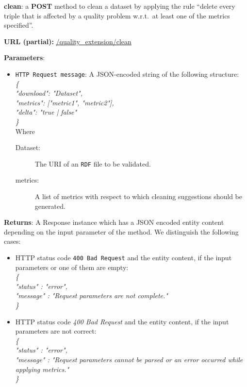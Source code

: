\begin{description}
\item{\textbf{clean}:} a \textbf{POST} method to clean a dataset by applying the rule ``delete every triple that is affected by a quality problem w.r.t.\ at least one of the metrics specified''.

\textbf{URL (partial):} \url{/quality_extension/clean} 

\textbf{Parameters}: 
\begin{itemize}
\item \texttt{HTTP Request message}: A JSON-encoded string of the following structure: \\
\textit{\{} \\
\hspace*{0.5 cm}\textit{"download": "Dataset",} \\
\hspace*{0.5 cm}\textit{"metrics": ["metric1", "metric2"],} \\
\hspace*{0.5 cm}\textit{"delta": "true | false"} \\  
\textit{\}} \\

Where 
\begin{description}
\item[Dataset:] The URI of an \texttt{RDF} file to be validated. 
\item[metrics:] A list of metrics with respect to which cleaning suggestions should be generated.
\end{description}

\end{itemize}
\textbf{Returns}: A Response instance which has a JSON encoded entity content depending on the input parameter of the method. We distinguish the following cases: 
\begin{itemize}
\item  HTTP status code \texttt{400 Bad Request} and the entity content, if the input parameters or one of them are empty:\\ \hspace*{0.2 cm}\textit{\{}\\
\hspace*{0.5 cm} \textit{"status" : "error",}\\
\hspace*{0.5 cm} \textit{"message" : "Request parameters are not complete."}\\ \hspace*{0.2 cm} \textit{\}} 

\item HTTP status code \textit{400 Bad Request} and the entity content, if the input parameters are not correct:\\ \hspace*{0.2 cm} \textit{\{} \\
\hspace*{0.5 cm} \textit{"status" : "error",}\\
\hspace*{0.5 cm}  \textit{"message" : "Request parameters cannot be parsed or an error occurred while applying metrics."}\\ \hspace*{0.2 cm} \textit{\}}


\end{itemize}
\end{description}
